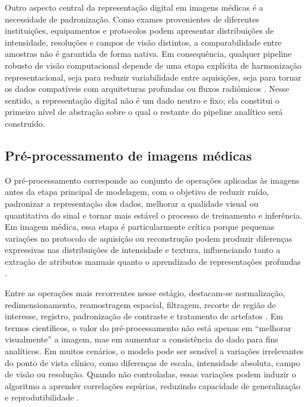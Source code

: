 \documentclass[tcc,capa]{texufpel}
\begin{document}
Outro aspecto central da representação digital em imagens médicas é a necessidade de padronização. Como exames provenientes de diferentes instituições, equipamentos e protocolos podem apresentar distribuições de intensidade, resoluções e campos de visão distintos, a comparabilidade entre amostras não é garantida de forma nativa. Em consequência, qualquer pipeline robusto de visão computacional depende de uma etapa explícita de harmonização representacional, seja para reduzir variabilidade entre aquisições, seja para tornar os dados compatíveis com arquiteturas profundas ou fluxos radiômicos \cite{vanTimmeren2020,Cobo2023}. Nesse sentido, a representação digital não é um dado neutro e fixo; ela constitui o primeiro nível de abstração sobre o qual o restante do pipeline analítico será construído.

\subsection{Pré-processamento de imagens médicas}

O pré-processamento corresponde ao conjunto de operações aplicadas às imagens antes da etapa principal de modelagem, com o objetivo de reduzir ruído, padronizar a representação dos dados, melhorar a qualidade visual ou quantitativa do sinal e tornar mais estável o processo de treinamento e inferência. Em imagem médica, essa etapa é particularmente crítica porque pequenas variações no protocolo de aquisição ou reconstrução podem produzir diferenças expressivas nas distribuições de intensidade e textura, influenciando tanto a extração de atributos manuais quanto o aprendizado de representações profundas \cite{vanTimmeren2020,Ce2024,Cobo2023}.

Entre as operações mais recorrentes nesse estágio, destacam-se normalização, redimensionamento, reamostragem espacial, filtragem, recorte de região de interesse, registro, padronização de contraste e tratamento de artefatos \cite{vanTimmeren2020,Cobo2023}. Em termos científicos, o valor do pré-processamento não está apenas em “melhorar visualmente” a imagem, mas em aumentar a consistência do dado para fins analíticos. Em muitos cenários, o modelo pode ser sensível a variações irrelevantes do ponto de vista clínico, como diferenças de escala, intensidade absoluta, campo de visão ou resolução. Quando não controladas, essas variações podem induzir o algoritmo a aprender correlações espúrias, reduzindo capacidade de generalização e reprodutibilidade \cite{Cobo2023,vanTimmeren2020}.
\end{document}
